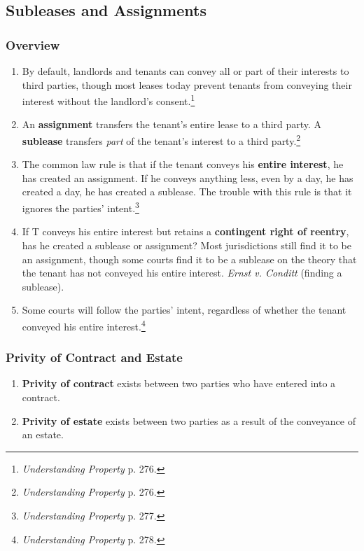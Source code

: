 \subsection{Subleases and Assignments}

\subsubsection{Overview}

\begin{enumerate}
    \item By default, landlords and tenants can convey all or part of their 
    interests to third parties, though most leases today prevent tenants from 
    conveying their interest without the landlord's 
    consent.\footnote{\emph{Understanding Property} p. 276.}
    \item An \textbf{assignment} transfers the tenant's entire lease to a 
    third party. A \textbf{sublease} transfers \emph{part} of the tenant's 
    interest to a third party.\footnote{\emph{Understanding Property} p. 276.}
    \item The common law rule is that if the tenant conveys his \textbf{entire 
    interest}, he has created an assignment. If he conveys anything less, even 
    by a day, he has created a day, he has created a sublease. The trouble 
    with this rule is that it ignores the parties' 
    intent.\footnote{\emph{Understanding Property} p. 277.}
    \item If T conveys his entire interest but retains a \textbf{contingent 
    right of reentry}, has he created a sublease or assignment? Most 
    jurisdictions still find it to be an assignment, though some courts find 
    it to be a sublease on the theory that the tenant has not conveyed his 
    entire interest. \emph{Ernst v. Conditt} (finding a sublease).
    \item Some courts will follow the parties' intent, regardless of whether 
    the tenant conveyed his entire interest.\footnote{\emph{Understanding 
    Property} p. 278.}
\end{enumerate}

\subsubsection{Privity of Contract and Estate}

\begin{enumerate}
    \item \textbf{Privity of contract} exists between two parties who have 
    entered into a contract.
    \item \textbf{Privity of estate} exists between two parties as a result of 
    the conveyance of an estate.
\end{enumerate}

